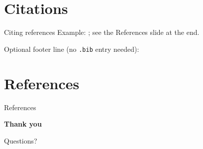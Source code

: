 \section{Citations}

\begin{frame}{Citing references}
  Example: \parencite{sample2024}; see the References slide at the end.

  \vspace{1em}
  Optional footer line (no \texttt{.bib} entry needed):
\end{frame}
\clearSlideBib

\section*{References}

\nocite{*}

\begin{frame}{References}
  \scriptsize
  \printbibliography[heading=none]
\end{frame}

\begin{frame}[plain]
  \centering
  \vspace{2cm}
  \textbf{\Large Thank you}
  \vspace{1.5cm}

  \normalsize Questions?
\end{frame}
